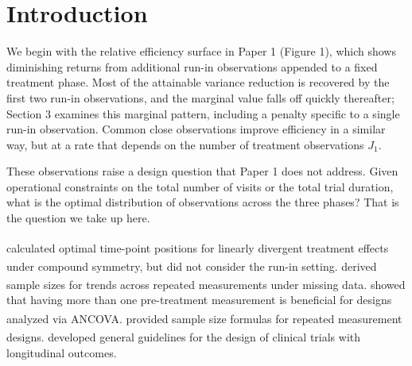\documentclass[
  11pt,
]{article}
\begin{document}
{
\setcounter{tocdepth}{2}
\tableofcontents
}
\section{Introduction}\label{introduction}

We begin with the relative efficiency surface in Paper 1
(Figure 1), which shows diminishing returns from
additional run-in observations appended to a fixed
treatment phase. Most of the attainable variance
reduction is recovered by the first two run-in
observations, and the marginal value falls off quickly
thereafter; Section 3 examines this marginal pattern,
including a penalty specific to a single run-in
observation. Common close observations improve
efficiency in a similar way, but at a rate that depends
on the number of treatment observations \(J_1\).

These observations raise a design question that Paper 1
does not address. Given operational constraints on the
total number of visits or the total trial duration, what
is the optimal distribution of observations across the
three phases? That is the question we take up here.

\textsuperscript{} calculated optimal time-point positions
for linearly divergent treatment effects under compound
symmetry, but did not consider the run-in setting.\textsuperscript{} derived sample sizes for trends across repeated
measurements under missing data.\textsuperscript{} showed that having more than one
pre-treatment measurement is beneficial for designs
analyzed via ANCOVA.\textsuperscript{} provided sample size
formulas for repeated measurement designs.\textsuperscript{} developed general guidelines for the
design of clinical trials with longitudinal outcomes.
\end{document}
